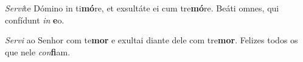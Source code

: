 \begin{greenumerate}
  \switchcolumn*


  \item \textit{Serví}te Dómino in ti\textbf{mó}re, {\GreDagger} et exsultáte ei cum tre\-\textbf{mó}re. {\GreStar} Beáti omnes, qui confídunt \textit{in} \textbf{e}o. 

  \switchcolumn%

  \item \textit{Servi} ao Senhor com te\textbf{mor} {\GreDagger} e exultai diante dele com tre\textbf{mor}. {\GreStar} Felizes todos os que nele \textit{con}\textbf{fi}am. 

\end{greenumerate}